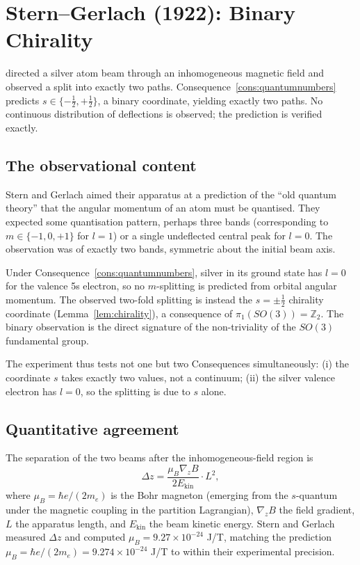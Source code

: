 \documentclass[11pt,twocolumn,a4paper]{article}
\theoremstyle{axiomstyle}
\theoremstyle{conseqstyle}
\theoremstyle{definition}
\theoremstyle{remark}
\newcommand{\Integer}{\mathbb{Z}}
\begin{document}
\section{Stern--Gerlach (1922): Binary Chirality}
\label{sec:sg}

\citet{stern1921,gerlach1922} directed a silver atom beam through an inhomogeneous magnetic field and observed a split into exactly two paths. Consequence~\ref{cons:quantumnumbers} predicts $s\in\{-\tfrac12,+\tfrac12\}$, a binary coordinate, yielding exactly two paths. No continuous distribution of deflections is observed; the prediction is verified exactly.

\subsection{The observational content}

Stern and Gerlach aimed their apparatus at a prediction of the ``old quantum theory'' that the angular momentum of an atom must be quantised. They expected some quantisation pattern, perhaps three bands (corresponding to $m\in\{-1,0,+1\}$ for $l=1$) or a single undeflected central peak for $l=0$. The observation was of exactly two bands, symmetric about the initial beam axis.

Under Consequence~\ref{cons:quantumnumbers}, silver in its ground state has $l=0$ for the valence 5s electron, so no $m$-splitting is predicted from orbital angular momentum. The observed two-fold splitting is instead the $s=\pm\tfrac{1}{2}$ chirality coordinate (Lemma~\ref{lem:chirality}), a consequence of $\pi_{1}(SO(3))=\Integer_{2}$. The binary observation is the direct signature of the non-triviality of the $SO(3)$ fundamental group.

The experiment thus tests not one but two Consequences simultaneously: (i) the coordinate $s$ takes exactly two values, not a continuum; (ii) the silver valence electron has $l=0$, so the splitting is due to $s$ alone.

\subsection{Quantitative agreement}

The separation of the two beams after the inhomogeneous-field region is
\begin{equation*}
\Delta z=\frac{\mu_{B}\nabla_{z}B}{2E_{\text{kin}}}\cdot L^{2},
\end{equation*}
where $\mu_{B}=\hbar e/(2m_{e})$ is the Bohr magneton (emerging from the $s$-quantum under the magnetic coupling in the partition Lagrangian), $\nabla_{z}B$ the field gradient, $L$ the apparatus length, and $E_{\text{kin}}$ the beam kinetic energy. Stern and Gerlach measured $\Delta z$ and computed $\mu_{B}=9.27\times 10^{-24}$ J/T, matching the prediction $\mu_{B}=\hbar e/(2m_{e})=9.274\times 10^{-24}$ J/T to within their experimental precision.
\end{document}
